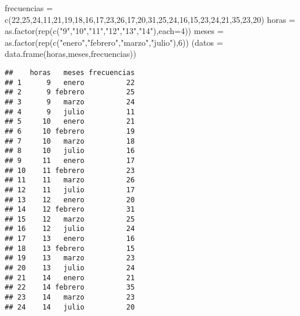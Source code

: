 \documentclass[
]{article}
\newenvironment{Shaded}{\begin{snugshade}}{\end{snugshade}}
\newcommand{\AttributeTok}[1]{\textcolor[rgb]{0.77,0.63,0.00}{#1}}
\newcommand{\DecValTok}[1]{\textcolor[rgb]{0.00,0.00,0.81}{#1}}
\newcommand{\FunctionTok}[1]{\textcolor[rgb]{0.00,0.00,0.00}{#1}}
\newcommand{\NormalTok}[1]{#1}
\newcommand{\OtherTok}[1]{\textcolor[rgb]{0.56,0.35,0.01}{#1}}
\newcommand{\StringTok}[1]{\textcolor[rgb]{0.31,0.60,0.02}{#1}}
\begin{document}
\begin{Shaded}
\begin{Highlighting}[]
\NormalTok{frecuencias }\OtherTok{=} \FunctionTok{c}\NormalTok{(}\DecValTok{22}\NormalTok{,}\DecValTok{25}\NormalTok{,}\DecValTok{24}\NormalTok{,}\DecValTok{11}\NormalTok{,}\DecValTok{21}\NormalTok{,}\DecValTok{19}\NormalTok{,}\DecValTok{18}\NormalTok{,}\DecValTok{16}\NormalTok{,}\DecValTok{17}\NormalTok{,}\DecValTok{23}\NormalTok{,}\DecValTok{26}\NormalTok{,}\DecValTok{17}\NormalTok{,}\DecValTok{20}\NormalTok{,}\DecValTok{31}\NormalTok{,}\DecValTok{25}\NormalTok{,}\DecValTok{24}\NormalTok{,}\DecValTok{16}\NormalTok{,}\DecValTok{15}\NormalTok{,}\DecValTok{23}\NormalTok{,}\DecValTok{24}\NormalTok{,}\DecValTok{21}\NormalTok{,}\DecValTok{35}\NormalTok{,}\DecValTok{23}\NormalTok{,}\DecValTok{20}\NormalTok{)}
\NormalTok{horas }\OtherTok{=} \FunctionTok{as.factor}\NormalTok{(}\FunctionTok{rep}\NormalTok{(}\FunctionTok{c}\NormalTok{(}\StringTok{"9"}\NormalTok{,}\StringTok{"10"}\NormalTok{,}\StringTok{"11"}\NormalTok{,}\StringTok{"12"}\NormalTok{,}\StringTok{"13"}\NormalTok{,}\StringTok{"14"}\NormalTok{),}\AttributeTok{each=}\DecValTok{4}\NormalTok{))}
\NormalTok{meses }\OtherTok{=} \FunctionTok{as.factor}\NormalTok{(}\FunctionTok{rep}\NormalTok{(}\FunctionTok{c}\NormalTok{(}\StringTok{"enero"}\NormalTok{,}\StringTok{"febrero"}\NormalTok{,}\StringTok{"marzo"}\NormalTok{,}\StringTok{"julio"}\NormalTok{),}\DecValTok{6}\NormalTok{))}
\NormalTok{(}\AttributeTok{datos =} \FunctionTok{data.frame}\NormalTok{(horas,meses,frecuencias))}
\end{Highlighting}
\end{Shaded}

\begin{verbatim}
##    horas   meses frecuencias
## 1      9   enero          22
## 2      9 febrero          25
## 3      9   marzo          24
## 4      9   julio          11
## 5     10   enero          21
## 6     10 febrero          19
## 7     10   marzo          18
## 8     10   julio          16
## 9     11   enero          17
## 10    11 febrero          23
## 11    11   marzo          26
## 12    11   julio          17
## 13    12   enero          20
## 14    12 febrero          31
## 15    12   marzo          25
## 16    12   julio          24
## 17    13   enero          16
## 18    13 febrero          15
## 19    13   marzo          23
## 20    13   julio          24
## 21    14   enero          21
## 22    14 febrero          35
## 23    14   marzo          23
## 24    14   julio          20
\end{verbatim}
\end{document}

